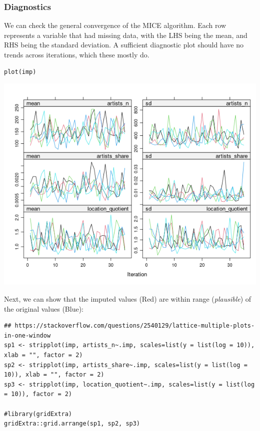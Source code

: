 \documentclass[8pt]{article}
\begin{document}
\subsubsection{Diagnostics}
\label{sec:orgbf70547}
We can check the general convergence of the MICE algorithm. Each row represents a variable that had missing data, with the LHS being the mean, and RHS being the standard deviation. A sufficient diagnostic plot should have no trends across iterations, which these mostly do.

\begin{verbatim}
plot(imp)
\end{verbatim}

\begin{center}
\includegraphics[width=.9\linewidth]{media/diag.png}
\end{center}


Next, we can show that the imputed values (Red) are within range (\emph{plausible}) of the original values (Blue):
\begin{verbatim}
## https://stackoverflow.com/questions/2540129/lattice-multiple-plots-in-one-window
sp1 <- stripplot(imp, artists_n~.imp, scales=list(y = list(log = 10)), xlab = "", factor = 2)
sp2 <- stripplot(imp, artists_share~.imp, scales=list(y = list(log = 10)), xlab = "", factor = 2)
sp3 <- stripplot(imp, location_quotient~.imp, scales=list(y = list(log = 10)), factor = 2)

#library(gridExtra)
gridExtra::grid.arrange(sp1, sp2, sp3)
\end{verbatim}
\end{document}
